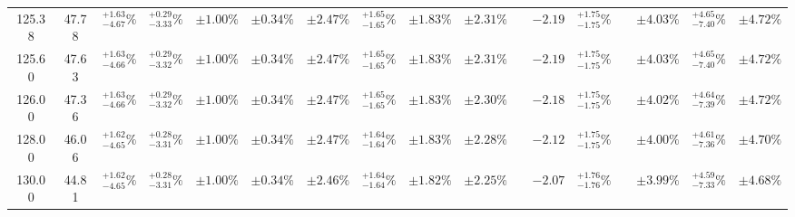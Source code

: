 \begin{landscape}
\begin{table}[ht!]
{\begin{tabular}{| cc | cccc | ccc | c |@{}c@{\;}| cc |@{}c@{\;}| ccc |}
125.38 & 47.78 & \({}^{ +1.63}_{ -4.67}\%\) & {\color{black!55}\({}^{ +0.29}_{ -3.33}\%\)} & {\color{black!55}\(\pm{  1.00}\%\)} & {\color{black!55}\(\pm{  0.34}\%\)} & \(\pm 2.47\%\) & {\color{black!55}\({}^{ +1.65}_{ -1.65}\%\)} & {\color{black!55}\(\pm 1.83\%\)} & \(\pm{  2.31}\%\) &  & \(-2.19\) & \({}^{ +1.75}_{ -1.75}\%\) &  & \(\pm 4.03\%\) & \({}^{ +4.65}_{ -7.40}\%\) & \(\pm 4.72\%\)\\
125.60 & 47.63 & \({}^{ +1.63}_{ -4.66}\%\) & {\color{black!55}\({}^{ +0.29}_{ -3.32}\%\)} & {\color{black!55}\(\pm{  1.00}\%\)} & {\color{black!55}\(\pm{  0.34}\%\)} & \(\pm 2.47\%\) & {\color{black!55}\({}^{ +1.65}_{ -1.65}\%\)} & {\color{black!55}\(\pm 1.83\%\)} & \(\pm{  2.31}\%\) &  & \(-2.19\) & \({}^{ +1.75}_{ -1.75}\%\) &  & \(\pm 4.03\%\) & \({}^{ +4.65}_{ -7.40}\%\) & \(\pm 4.72\%\)\\
126.00 & 47.36 & \({}^{ +1.63}_{ -4.66}\%\) & {\color{black!55}\({}^{ +0.29}_{ -3.32}\%\)} & {\color{black!55}\(\pm{  1.00}\%\)} & {\color{black!55}\(\pm{  0.34}\%\)} & \(\pm 2.47\%\) & {\color{black!55}\({}^{ +1.65}_{ -1.65}\%\)} & {\color{black!55}\(\pm 1.83\%\)} & \(\pm{  2.30}\%\) &  & \(-2.18\) & \({}^{ +1.75}_{ -1.75}\%\) &  & \(\pm 4.02\%\) & \({}^{ +4.64}_{ -7.39}\%\) & \(\pm 4.72\%\)\\
128.00 & 46.06 & \({}^{ +1.62}_{ -4.65}\%\) & {\color{black!55}\({}^{ +0.28}_{ -3.31}\%\)} & {\color{black!55}\(\pm{  1.00}\%\)} & {\color{black!55}\(\pm{  0.34}\%\)} & \(\pm 2.47\%\) & {\color{black!55}\({}^{ +1.64}_{ -1.64}\%\)} & {\color{black!55}\(\pm 1.83\%\)} & \(\pm{  2.28}\%\) &  & \(-2.12\) & \({}^{ +1.75}_{ -1.75}\%\) &  & \(\pm 4.00\%\) & \({}^{ +4.61}_{ -7.36}\%\) & \(\pm 4.70\%\)\\
130.00 & 44.81 & \({}^{ +1.62}_{ -4.65}\%\) & {\color{black!55}\({}^{ +0.28}_{ -3.31}\%\)} & {\color{black!55}\(\pm{  1.00}\%\)} & {\color{black!55}\(\pm{  0.34}\%\)} & \(\pm 2.46\%\) & {\color{black!55}\({}^{ +1.64}_{ -1.64}\%\)} & {\color{black!55}\(\pm 1.82\%\)} & \(\pm{  2.25}\%\) &  & \(-2.07\) & \({}^{ +1.76}_{ -1.76}\%\) &  & \(\pm 3.99\%\) & \({}^{ +4.59}_{ -7.33}\%\) & \(\pm 4.68\%\)\\
\cline{1-10} \cline{12-13} \cline{15-17}
\end{tabular}
}
\end{table}


\end{landscape}
